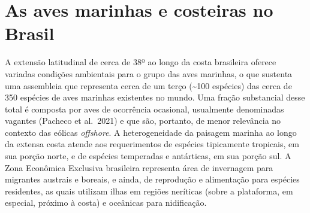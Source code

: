 \documentclass[
  oneside]{scrbook}
\begin{document}
\hypertarget{as-aves-marinhas-e-costeiras-no-brasil}{%
\section{As aves marinhas e costeiras no Brasil}\label{as-aves-marinhas-e-costeiras-no-brasil}}

A extensão latitudinal de cerca de 38º ao longo da costa brasileira oferece variadas condições ambientais para o grupo das aves marinhas, o que sustenta uma assembleia que representa cerca de um terço (\textasciitilde100 espécies) das cerca de 350 espécies de aves marinhas existentes no mundo. Uma fração substancial desse total é composta por aves de ocorrência ocasional, usualmente denominadas vagantes (Pacheco et al.~2021) e que são, portanto, de menor relevância no contexto das eólicas \emph{offshore}. A heterogeneidade da paisagem marinha ao longo da extensa costa atende aos requerimentos de espécies tipicamente tropicais, em sua porção norte, e de espécies temperadas e antárticas, em sua porção sul. A Zona Econômica Exclusiva brasileira representa área de invernagem para migrantes austrais e boreais, e ainda, de reprodução e alimentação para espécies residentes, as quais utilizam ilhas em regiões neríticas (sobre a plataforma, em especial, próximo à costa) e oceânicas para nidificação.
\end{document}
